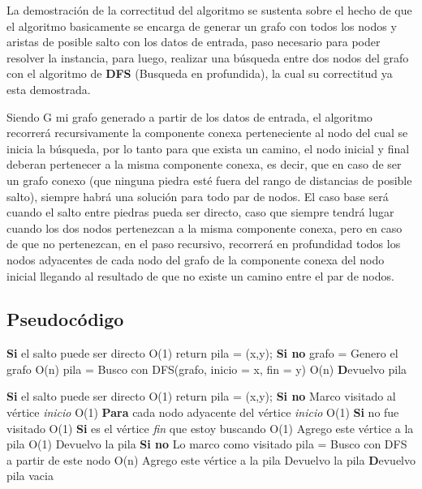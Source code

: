 La demostración de la correctitud del algoritmo se sustenta sobre el hecho de que el algoritmo basicamente se encarga de generar un grafo con todos los nodos y aristas de posible salto con los datos de entrada, paso necesario para poder resolver la instancia, para luego, realizar una búsqueda entre dos nodos del grafo con el algoritmo de \textbf{DFS} (Busqueda en profundida), la cual su correctitud ya esta demostrada. 

Siendo G mi grafo generado a partir de los datos de entrada, el algoritmo recorrerá recursivamente la componente conexa perteneciente al nodo del cual se inicia la búsqueda, por lo tanto para que exista un camino, el nodo inicial y final deberan pertenecer a la misma componente conexa, es decir, que en caso de ser un grafo conexo (que ninguna piedra esté fuera del rango de distancias de posible salto), siempre habrá una solución para todo par de nodos. El caso base será cuando el salto entre piedras pueda ser directo, caso que siempre tendrá lugar cuando los dos nodos pertenezcan a la misma componente conexa, pero en caso de que no pertenezcan, en el paso recursivo, recorrerá en profundidad todos los nodos adyacentes de cada nodo del grafo de la componente conexa del nodo inicial llegando al resultado de que no existe un camino entre el par de nodos.

\subsection{Pseudoc\'odigo}
\begin{codebox}
\li	\textbf{Si} el salto puede ser directo \Do \RComment O(1)
\li		return pila = (x,y); \End
\li	\textbf{Si no}  \Do
\li		grafo = Genero el grafo 				\RComment O(n)
\li		pila = Busco con DFS(grafo, inicio = x, fin = y)	\RComment O(n)\End 
\li	\textbf Devuelvo pila
\end{codebox}

\begin{codebox}
\li	\textbf{Si} el salto puede ser directo \Do 							\RComment O(1)
\li		return pila = (x,y); \End
\li	\textbf{Si no}  \Do
\li		Marco visitado al vértice \textit{inicio}						\RComment O(1)
\li		\textbf{Para} cada nodo adyacente del vértice \textit{inicio} \Do 	\RComment O(1)
\li			\textbf{Si} no fue visitado \Do \RComment O(1)
\li				\textbf{Si} es el vértice \textit{fin} que estoy buscando \Do \RComment O(1)	
\li					Agrego este vértice a la pila					\RComment O(1)
\li					Devuelvo la pila\End
\li				\textbf{Si no}  \Do
\li					Lo marco como visitado
\li					pila = Busco con DFS a partir de este nodo			\RComment O(n)
\li					Agrego este vértice a la pila
\li					Devuelvo la pila\End\End\End
\li	\textbf Devuelvo pila vacia
\end{codebox}

